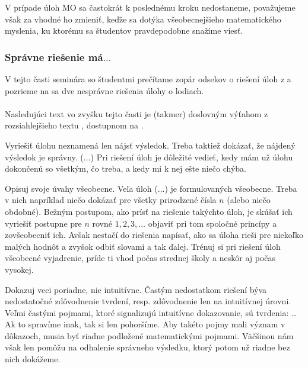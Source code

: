 {V prípade úloh MO sa častokrát k poslednému kroku nedostaneme, považujeme však za vhodné ho zmieniť, keďže sa dotýka všeobecnejšieho matematického myslenia, ku ktorému sa študentov pravdepodobne snažíme viesť.

\subsubsection*{Správne riešenie má$\ldots$}

V tejto časti seminára so študentmi prečítame zopár odsekov o riešení úloh z \cite{kms} a pozrieme na sa dve nesprávne riešenia úlohy o lodiach. \\
\\
Nasledujúci text vo zvyšku tejto časti je (takmer) doslovným výťahom z rozsiahlejšieho textu , dostupnom na \cite{kms}.

Vyriešiť úlohu neznamená len nájsť výsledok. Treba taktiež dokázať, že nájdený výsledok je správny. ($\ldots$) Pri riešení úloh je dôležité vedieť, kedy mám už úlohu dokončenú so všetkým, čo treba, a kedy mi k nej ešte niečo chýba. 

Opisuj svoje úvahy všeobecne. Veľa úloh ($\ldots$) je formulovaných všeobecne. Treba v nich napríklad niečo dokázať pre všetky prirodzené čísla $n$ (alebo niečo obdobné). Bežným postupom, ako prísť na riešenie takýchto úloh, je skúšať ich vyriešiť postupne pre $n$ rovné $1, 2, 3, \ldots$ objaviť pri tom spoločné princípy a zovšeobecniť ich. Avšak nestačí do riešenia napísať, ako sa úloha rieši pre niekoľko malých hodnôt a zvyšok odbiť slovami a tak ďalej. Trénuj si pri riešení úloh všeobecné vyjadrenie, príde ti vhod počas strednej školy a neskôr aj počas vysokej.

Dokazuj veci poriadne, nie intuitívne. Častým nedostatkom riešení býva nedostatočné zdôvodnenie tvrdení, resp. zdôvodnenie len na intuitívnej úrovni. Veľmi častými pojmami, ktoré signalizujú intuitívne dokazovanie, sú tvrdenia:   \ldots{Ak to spravíme inak, tak si len pohoršíme.} Aby takéto pojmy mali význam v dôkazoch, musia byť riadne podložené matematickými pojmami. Väčšinou nám však len pomôžu na odhalenie správneho výsledku, ktorý potom už riadne bez nich dokážeme.

}
